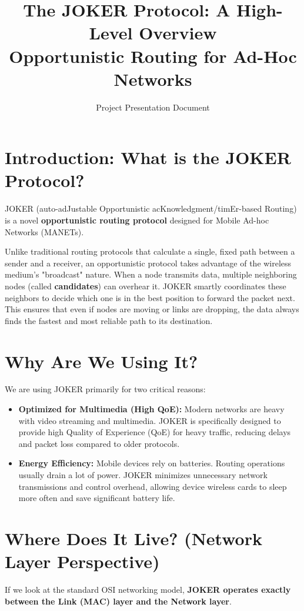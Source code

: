 \documentclass[12pt]{article}
\title{\textbf{The JOKER Protocol: A High-Level Overview}\\
\Large Opportunistic Routing for Ad-Hoc Networks}
\author{Project Presentation Document}
\date{}
\begin{document}
\maketitle
\tableofcontents
\newpage

\section{Introduction: What is the JOKER Protocol?}
JOKER (auto-adJustable Opportunistic acKnowledgment/timEr-based Routing) is a novel \textbf{opportunistic routing protocol} designed for Mobile Ad-hoc Networks (MANETs). 

Unlike traditional routing protocols that calculate a single, fixed path between a sender and a receiver, an opportunistic protocol takes advantage of the wireless medium's "broadcast" nature. When a node transmits data, multiple neighboring nodes (called \textbf{candidates}) can overhear it. JOKER smartly coordinates these neighbors to decide which one is in the best position to forward the packet next. This ensures that even if nodes are moving or links are dropping, the data always finds the fastest and most reliable path to its destination.

\section{Why Are We Using It?}
We are using JOKER primarily for two critical reasons:
\begin{itemize}
    \item \textbf{Optimized for Multimedia (High QoE):} Modern networks are heavy with video streaming and multimedia. JOKER is specifically designed to provide high Quality of Experience (QoE) for heavy traffic, reducing delays and packet loss compared to older protocols.
    \item \textbf{Energy Efficiency:} Mobile devices rely on batteries. Routing operations usually drain a lot of power. JOKER minimizes unnecessary network transmissions and control overhead, allowing device wireless cards to sleep more often and save significant battery life.
\end{itemize}

\section{Where Does It Live? (Network Layer Perspective)}
If we look at the standard OSI networking model, \textbf{JOKER operates exactly between the Link (MAC) layer and the Network layer}. 
\end{document}
